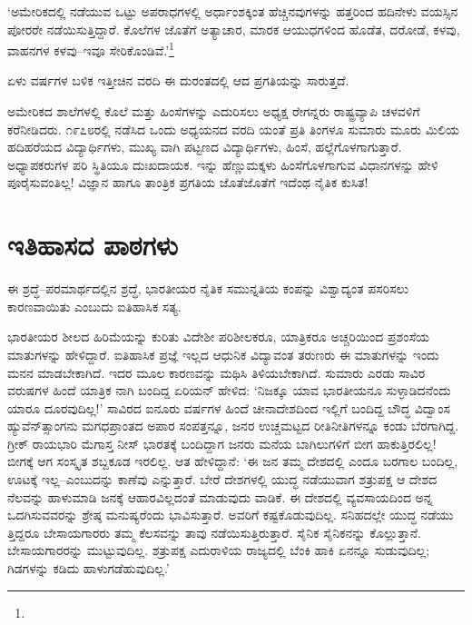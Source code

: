 ‘ಅಮೇರಿಕದಲ್ಲಿ ನಡೆಯುವ ಒಟ್ಟು ಅಪರಾಧಗಳಲ್ಲಿ ಅರ್ಧಾಂಶಕ್ಕಿಂತ ಹೆಚ್ಚಿನವುಗಳನ್ನು ಹತ್ತರಿಂದ ಹದಿನೇಳು ವಯಸ್ಸಿನ ಪೋರರೇ ನಡೆಯಿಸುತ್ತಿದ್ದಾರೆ. ಕೊಲೆಗಳ ಜೊತೆಗೆ ಅತ್ಯಾಚಾರ, ಮಾರಕ ಆಯುಧಗಳಿಂದ ಹೊಡೆತ, ದರೋಡೆ, ಕಳವು, ವಾಹನಗಳ ಕಳವು–ಇವೂ ಸೇರಿಕೊಂಡಿವೆ.’\footnote{}

ಏಳು ವರ್ಷಗಳ ಬಳಿಕ ಇತ್ತೀಚಿನ ವರದಿ ಈ ದುರಂತದಲ್ಲಿ ಆದ ಪ್ರಗತಿಯನ್ನು ಸಾರುತ್ತದೆ.

ಅಮೇರಿಕದ ಶಾಲೆಗಳಲ್ಲಿ ಕೊಲೆ ಮತ್ತು ಹಿಂಸೆಗಳನ್ನು ಎದುರಿಸಲು ಅಧ್ಯಕ್ಷ ರೇಗನ್ನರು ರಾಷ್ಟ್ರವ್ಯಾಪಿ ಚಳವಳಿಗೆ ಕರೆನೀಡಿದರು. ೧೯೭೮ರಲ್ಲಿ ನಡೆಸಿದ ಒಂದು ಅಧ್ಯಯನದ ವರದಿ ಯಂತೆ ಪ್ರತಿ ತಿಂಗಳೂ ಸುಮಾರು ಮೂರು ಮಿಲಿಯ ಹದಿಹರೆಯದ ವಿದ್ಯಾರ್ಥಿಗಳು, ಮುಖ್ಯ ವಾಗಿ ಪಟ್ಟಣದ ವಿದ್ಯಾರ್ಥಿಗಳು, ಹಿಂಸೆ, ಹಲ್ಲೆಗೊಳಗಾಗುತ್ತಾರೆ. ಅಧ್ಯಾಪಕರುಗಳ ಪರಿ ಸ್ಥಿತಿಯೂ ದುಃಖದಾಯಕ. ಇನ್ನು ಹೆಣ್ಣುಮಕ್ಕಳು ಹಿಂಸೆಗೊಳಗಾಗುವ ವಿಧಾನಗಳನ್ನು ಹೇಳಿ ಪೂರೈಸುವಂತಿಲ್ಲ! ವಿಜ್ಞಾನ ಹಾಗೂ ತಾಂತ್ರಿಕ ಪ್ರಗತಿಯ ಜೊತೆಜೊತೆಗೆ ಇದೆಂಥ ನೈತಿಕ ಕುಸಿತ!


\section{ಇತಿಹಾಸದ ಪಾಠಗಳು}

ಈ ಶ್ರದ್ಧೆ–ಪರಮಾರ್ಥದಲ್ಲಿನ ಶ್ರದ್ಧೆ, ಭಾರತೀಯರ ನೈತಿಕ ಸಮುನ್ನತಿಯ ಕಂಪನ್ನು ವಿಶ್ವಾದ್ಯಂತ ಪಸರಿಸಲು ಕಾರಣವಾಯಿತು ಎಂಬುದು ಐತಿಹಾಸಿಕ ಸತ್ಯ.

ಭಾರತೀಯರ ಶೀಲದ ಹಿರಿಮೆಯನ್ನು ಕುರಿತು ವಿದೇಶೀ ಪರಿಶೀಲಕರೂ, ಯಾತ್ರಿಕರೂ ಅಚ್ಚರಿಯಿಂದ ಪ್ರಶಂಸೆಯ ಮಾತುಗಳನ್ನು ಹೇಳಿದ್ದಾರೆ. ಐತಿಹಾಸಿಕ ಪ್ರಜ್ಞೆ ಇಲ್ಲದ ಆಧುನಿಕ ವಿದ್ಯಾವಂತ ತರುಣರು ಈ ಮಾತುಗಳನ್ನು ಇಂದು ಮನನ ಮಾಡಬೇಕಾಗಿದೆ. ಇದರ ಮೂಲ ಕಾರಣವನ್ನು ಮಥಿಸಿ ತಿಳಿಯಬೇಕಾಗಿದೆ. ಸುಮಾರು ಎರಡು ಸಾವಿರ ವರುಷಗಳ ಹಿಂದೆ ಯಾತ್ರಿಕ ನಾಗಿ ಬಂದಿದ್ದ ಏರಿಯನ್ ಹೇಳಿದ: ‘ನಿಜಕ್ಕೂ ಯಾವ ಭಾರತೀಯನೂ ಸುಳ್ಳಾಡಿದನೆಂದು ಯಾರೂ ದೂರವುದಿಲ್ಲ!’ ಸಾವಿರದ ಐನೂರು ವರ್ಷಗಳ ಹಿಂದೆ ಚೀನಾದೇಶದಿಂದ ಇಲ್ಲಿಗೆ ಬಂದಿದ್ದ ಬೌದ್ಧ ವಿದ್ವಾಂಸ ಹ್ಯುವೆನ್​ತ್ಸಾಂಗನು ಮಗಧಪ್ರಾಂತದ ಅಪಾರ ಸಂಪತ್ತನ್ನೂ, ಜನರ ಉಚ್ಚಮಟ್ಟದ ರೀತಿನೀತಿಗಳನ್ನೂ ಕಂಡು ಬೆರಗಾಗಿದ್ದ. ಗ್ರೀಕ್ ರಾಯಭಾರಿ ಮೆಗಾಸ್ತ ನೀಸ್ ಭಾರತಕ್ಕೆ ಬಂದಿದ್ದಾಗ ಜನರು ಮನೆಯ ಬಾಗಿಲುಗಳಿಗೆ ಬೀಗ ಹಾಕುತ್ತಿರಲಿಲ್ಲ! ಬೀಗಕ್ಕೆ ಆಗ ಸಂಸ್ಕೃತ ಶಬ್ದಕೂಡ ಇರಲಿಲ್ಲ. ಆತ ಹೇಳಿದ್ದಾನೆ: ‘ಈ ಜನ ತಮ್ಮ ದೇಶದಲ್ಲಿ ಎಂದೂ ಬರಗಾಲ ಬಂದಿಲ್ಲ, ಊಟಕ್ಕೆ ಇಲ್ಲ–ಎಂಬುದನ್ನು ಕಾಣೆವು ಎನ್ನುತ್ತಾರೆ. ಬೇರೆ ದೇಶಗಳಲ್ಲಿ ಯುದ್ಧ ನಡೆಯುವಾಗ ಶತ್ರುಪಕ್ಷ ಆ ದೇಶದ ನೆಲವನ್ನು ಹಾಳುಮಾಡಿ ಜನಕ್ಕೆ ಆಹಾರವಿಲ್ಲದಂತೆ ಮಾಡುವುದು ವಾಡಿಕೆ. ಈ ದೇಶದಲ್ಲಿ ವ್ಯವಸಾಯದಿಂದ ಅನ್ನ ಒದಗಿಸುವವರನ್ನು ಶ್ರೇಷ್ಠ ಮನುಷ್ಯರೆಂದು ಭಾವಿಸುತ್ತಾರೆ. ಅವರಿಗೆ ಕಷ್ಟಕೊಡುವುದಿಲ್ಲ. ಸನಿಹದಲ್ಲೇ ಯುದ್ಧ ನಡೆಯು ತ್ತಿದ್ದರೂ ಬೇಸಾಯಗಾರರು ತಮ್ಮ ಕೆಲಸವನ್ನು ತಾವು ನಡೆಯಿಸುತ್ತಿರುತ್ತಾರೆ. ಸೈನಿಕ ಸೈನಿಕನನ್ನು ಕೊಲ್ಲುತ್ತಾನೆ. ಬೇಸಾಯಗಾರರನ್ನು ಮುಟ್ಟುವುದಿಲ್ಲ. ಶತ್ರುಪಕ್ಷ ಎದುರಾಳಿಯ ರಾಜ್ಯದಲ್ಲಿ ಬೆಂಕಿ ಹಾಕಿ ಏನನ್ನೂ ಸುಡುವುದಿಲ್ಲ; ಗಿಡಗಳನ್ನು ಕಡಿದು ಹಾಳುಗಡೆಹುವುದಿಲ್ಲ.’

